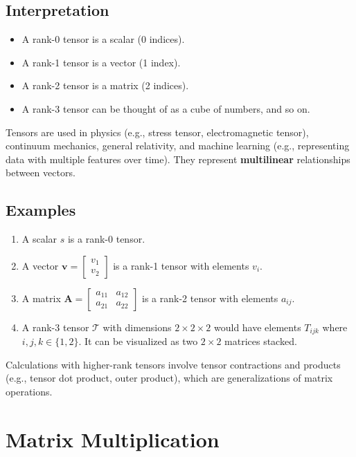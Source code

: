 \documentclass{article}
\newcommand{\vect}[1]{\bm{#1}} %
\newcommand{\mat}[1]{\bm{#1}}  %
\begin{document}
\subsection*{Interpretation}
\begin{itemize}
    \item A rank-0 tensor is a scalar (0 indices).
    \item A rank-1 tensor is a vector (1 index).
    \item A rank-2 tensor is a matrix (2 indices).
    \item A rank-3 tensor can be thought of as a cube of numbers, and so on.
\end{itemize}
Tensors are used in physics (e.g., stress tensor, electromagnetic tensor), continuum mechanics, general relativity, and machine learning (e.g., representing data with multiple features over time). They represent \textbf{multilinear} relationships between vectors.

\subsection*{Examples}
\begin{enumerate}
    \item A scalar $s$ is a rank-0 tensor.
    \item A vector $\vect{v} = \begin{bmatrix} v_1 \\ v_2 \end{bmatrix}$ is a rank-1 tensor with elements $v_i$.
    \item A matrix $\mat{A} = \begin{bmatrix} a_{11} & a_{12} \\ a_{21} & a_{22} \end{bmatrix}$ is a rank-2 tensor with elements $a_{ij}$.
    \item A rank-3 tensor $\mathcal{T}$ with dimensions $2 \times 2 \times 2$ would have elements $T_{ijk}$ where $i, j, k \in \{1, 2\}$. It can be visualized as two $2 \times 2$ matrices stacked.
\end{enumerate}
Calculations with higher-rank tensors involve tensor contractions and products (e.g., tensor dot product, outer product), which are generalizations of matrix operations.

\section{Matrix Multiplication}
\end{document}

